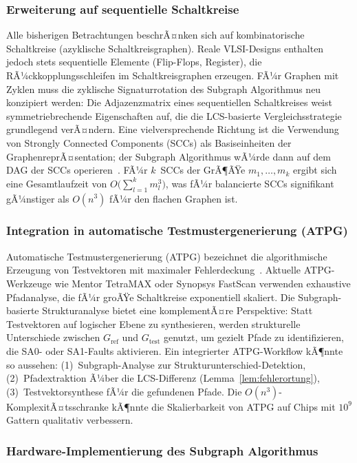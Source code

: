 ﻿\documentclass[a4paper,12pt]{article}
\theoremstyle{definition}
\begin{document}
\subsubsection{Erweiterung auf sequentielle Schaltkreise}

Alle bisherigen Betrachtungen beschrÃ¤nken sich auf kombinatorische
Schaltkreise (azyklische Schaltkreisgraphen). Reale VLSI-Designs
enthalten jedoch stets sequentielle Elemente (Flip-Flops, Register),
die RÃ¼ckkopplungsschleifen im Schaltkreisgraphen erzeugen. FÃ¼r
Graphen mit Zyklen muss die zyklische Signaturrotation des Subgraph
Algorithmus neu konzipiert werden: Die Adjazenzmatrix eines
sequentiellen Schaltkreises weist symmetriebrechende Eigenschaften
auf, die die LCS-basierte Vergleichsstrategie grundlegend verÃ¤ndern.
Eine vielversprechende Richtung ist die Verwendung von Strongly
Connected Components (SCCs) als Basiseinheiten der
GraphenreprÃ¤sentation; der Subgraph Algorithmus wÃ¼rde dann auf dem
DAG der SCCs operieren~\cite{cormen2009introduction}. FÃ¼r $k$~SCCs
der GrÃ¶ÃŸe $m_1, \ldots, m_k$ ergibt sich eine Gesamtlaufzeit von
$O\!\bigl(\sum_{l=1}^k m_l^3\bigr)$, was fÃ¼r balancierte SCCs
signifikant gÃ¼nstiger als $O(n^3)$ fÃ¼r den flachen Graphen ist.

\subsubsection{Integration in automatische Testmustergenerierung (ATPG)}

Automatische Testmustergenerierung (ATPG) bezeichnet die
algorithmische Erzeugung von Testvektoren mit maximaler
Fehlerdeckung~\cite{bushnell2000essentials}. Aktuelle ATPG-Werkzeuge
wie Mentor TetraMAX oder Synopsys FastScan verwenden exhaustive
Pfadanalyse, die fÃ¼r groÃŸe Schaltkreise exponentiell skaliert. Die
Subgraph-basierte Strukturanalyse bietet eine komplementÃ¤re
Perspektive: Statt Testvektoren auf logischer Ebene zu synthesieren,
werden strukturelle Unterschiede zwischen $G_{\mathrm{ref}}$ und
$G_{\mathrm{test}}$ genutzt, um gezielt Pfade zu identifizieren, die
SA0- oder SA1-Faults aktivieren. Ein integrierter ATPG-Workflow kÃ¶nnte
so aussehen: (1)~Subgraph-Analyse zur Strukturunterschied-Detektion,
(2)~Pfadextraktion Ã¼ber die LCS-Differenz (Lemma~\ref{lem:fehlerortung}),
(3)~Testvektorsynthese fÃ¼r die gefundenen Pfade.
Die $O(n^3)$-KomplexitÃ¤ts\-schranke kÃ¶nnte die Skalierbarkeit von
ATPG auf Chips mit $10^9$ Gattern qualitativ verbessern.

\subsubsection{Hardware-Implementierung des Subgraph Algorithmus}
\end{document}
